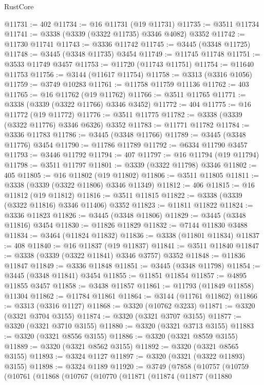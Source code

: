 \begin{lexlean}{RustCore}
\begin{coremodule}
@11731 := 402
@11734 := @16 @11731 (@19 @11731)
@11735 := @3511 @11734
@11741 := @3338 (@3339 (@3322 @11735) @3346 @4082) @3352
@11742 := @11730 @11741
@11743 := @3336 @11742
@11745 := @3445 (@3348 @11725)
@11748 := @3445 (@3348 @11735) @3454
@11749 := @11745 @11748
@11751 := @3533 @11749 @3457
@11753 := @11720 (@11743 @11751)
@11754 := @11640 @11753
@11756 := @3144 (@11617 @11754)
@11758 := @3313 (@3316 @1056)
@11759 := @3749 @10283
@11761 := @11758 @11759 @11136
@11762 := 403
@11765 := @16 @11762 (@19 @11762)
@11766 := @3511 @11765
@11771 := @3338 (@3339 (@3322 @11766) @3346 @3452)
@11772 := 404
@11775 := @16 @11772 (@19 @11772)
@11776 := @3511 @11775
@11782 := @3338 (@3339 (@3322 @11776) @3346 @6326) @3352
@11783 := @11771 @11782
@11784 := @3336 @11783
@11786 := @3445 (@3348 @11766)
@11789 := @3445 (@3348 @11776) @3454
@11790 := @11786 @11789
@11792 := @6334 @11790 @3457
@11793 := @3446 @11792
@11794 := 407
@11797 := @16 @11794 (@19 @11794)
@11798 := @3511 @11797
@11801 := @3339 (@3322 @11798) @3346
@11802 := 405
@11805 := @16 @11802 (@19 @11802)
@11806 := @3511 @11805
@11811 := @3338 (@3339 (@3322 @11806) @3346 @11349)
@11812 := 406
@11815 := @16 @11812 (@19 @11812)
@11816 := @3511 @11815
@11822 := @3338 (@3339 (@3322 @11816) @3346 @11406) @3352
@11823 := @11811 @11822
@11824 := @3336 @11823
@11826 := @3445 (@3348 @11806)
@11829 := @3445 (@3348 @11816) @3454
@11830 := @11826 @11829
@11832 := @7144 @11830 @3488
@11834 := @3464 (@11824 @11832)
@11836 := @3338 (@11801 @11834)
@11837 := 408
@11840 := @16 @11837 (@19 @11837)
@11841 := @3511 @11840
@11847 := @3338 (@3339 (@3322 @11841) @3346 @3757) @3352
@11848 := @11836 @11847
@11849 := @3336 @11848
@11851 := @3445 (@3348 @11798)
@11854 := @3445 (@3348 @11841) @3454
@11855 := @11851 @11854
@11857 := @4895 @11855 @3457
@11858 := @3438 @11857
@11861 := @11793 (@11849 @11858) @11304
@11862 := @11784 @11861
@11864 := @3144 (@11761 @11862)
@11866 := @3313 (@3316 @1127)
@11868 := @3320 (@10762 @3233)
@11871 := @3320 (@3321 @3704 @3155)
@11874 := @3320 (@3321 @3707 @3155)
@11877 := @3320 (@3321 @3710 @3155)
@11880 := @3320 (@3321 @3713 @3155)
@11883 := @3320 (@3321 @8556 @3155)
@11886 := @3320 (@3321 @8559 @3155)
@11889 := @3320 (@3321 @8562 @3155)
@11892 := @3320 (@3321 @8565 @3155)
@11893 := @3324 @1127
@11897 := @3320 (@3321 (@3322 @11893) @3155)
@11898 := @3324 @1189
@11920 := @3749
    (@7858
      (@10757
        (@10759
          (@10761
            (@11868
              (@10767
                (@10770
                  (@11871
                    (@11874
                      (@11877
                        (@11880

\end{coremodule}
\end{lexlean}
